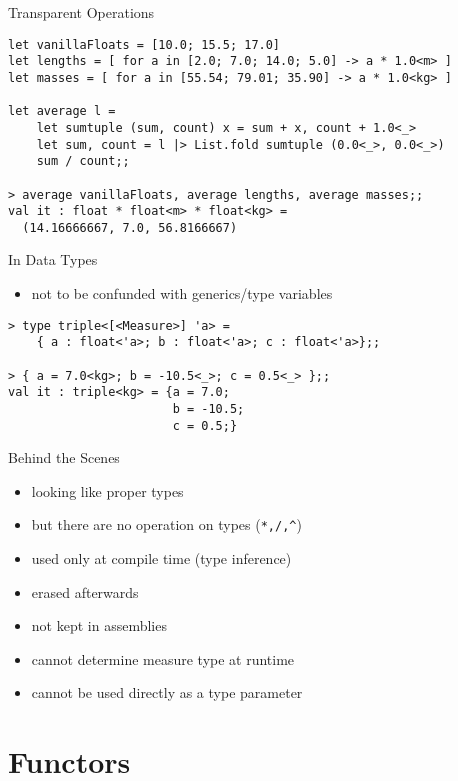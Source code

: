 \documentclass{beamer}
\begin{document}
\begin{frame}[fragile]{Transparent Operations}
  \small
  \begin{verbatim}
let vanillaFloats = [10.0; 15.5; 17.0]
let lengths = [ for a in [2.0; 7.0; 14.0; 5.0] -> a * 1.0<m> ]
let masses = [ for a in [55.54; 79.01; 35.90] -> a * 1.0<kg> ]

let average l =
    let sumtuple (sum, count) x = sum + x, count + 1.0<_>
    let sum, count = l |> List.fold sumtuple (0.0<_>, 0.0<_>)
    sum / count;;

> average vanillaFloats, average lengths, average masses;;
val it : float * float<m> * float<kg> =
  (14.16666667, 7.0, 56.8166667)
  \end{verbatim}
\end{frame}

\begin{frame}[fragile]{In Data Types}
  \begin{itemize}
    \item not to be confunded with generics/type variables
  \end{itemize}
  \begin{verbatim}
> type triple<[<Measure>] 'a> =
    { a : float<'a>; b : float<'a>; c : float<'a>};;

> { a = 7.0<kg>; b = -10.5<_>; c = 0.5<_> };;
val it : triple<kg> = {a = 7.0;
                       b = -10.5;
                       c = 0.5;}
  \end{verbatim}
\end{frame}

\begin{frame}{Behind the Scenes}
  \begin{itemize}[<+->]
    \item looking like proper types
    \item but there are no operation on types (\texttt{*,/,\^})
    \item used only at compile time (type inference)
    \item erased afterwards
    \item not kept in assemblies
    \item cannot determine measure type at runtime
    \item cannot be used directly as a type parameter
  \end{itemize}
\end{frame}

\section{Functors}
\frame{\tableofcontents[currentsection]}
\end{document}
